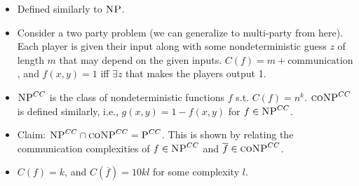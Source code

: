 \begin{itemize}
	\item Defined similarly to $\textsc{NP}$.
	\pause
	\item Consider a two party problem (we can generalize to multi-party from here).  Each player is given their input along with some nondeterministic guess $z$ of length $m$ that may depend on the given inputs.  $C(f) = m + \text{communication}$, and $f(x, y) = 1$ iff $\exists z$ that makes the players output 1.
	\pause
	\item $\textsc{NP}^{CC}$ is the class of nondeterministic functions $f$ s.t. $C(f) = n^{k}$.  $\textsc{coNP}^{CC}$ is defined similarly, i.e., $g(x, y) = 1 - f(x, y)$ for $f \in \textsc{NP}^{CC}$.
	\pause
	\item Claim: $\textsc{NP}^{CC} \cap \textsc{coNP}^{CC} = \textsc{P}^{CC}$.
	This is shown by relating the communication complexities of $f \in \textsc{NP}^{CC}$ and $\overline{f} \in \textsc{coNP}^{CC}$.
	\pause
	\item $C(f) = k$, and $C(\overline{f}) = 10kl$ for some complexity $l$.
\end{itemize}